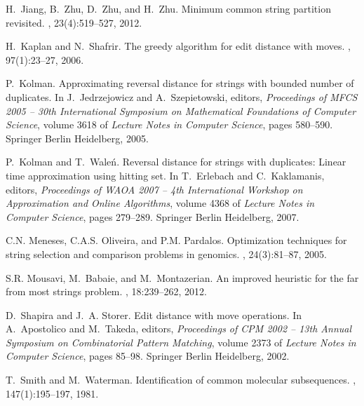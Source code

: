 \documentclass[11pt,a4paper]{article}
\begin{document}
\begin{thebibliography}{10}
H.~Jiang, B.~Zhu, D.~Zhu, and H.~Zhu.
\newblock Minimum common string partition revisited.
, 23(4):519--527, 2012.

H.~Kaplan and N.~Shafrir.
\newblock The greedy algorithm for edit distance with moves.
, 97(1):23--27, 2006.

P.~Kolman.
\newblock Approximating reversal distance for strings with bounded number of
  duplicates.
\newblock In J.~Jedrzejowicz and A.~Szepietowski, editors, {\em Proceedings of
  MFCS 2005 -- 30th International Symposium on Mathematical Foundations of
  Computer Science}, volume 3618 of {\em Lecture Notes in Computer Science},
  pages 580--590. Springer Berlin Heidelberg, 2005.

P.~Kolman and T.~Wale{\'n}.
\newblock Reversal distance for strings with duplicates: Linear time
  approximation using hitting set.
\newblock In T.~Erlebach and C.~Kaklamanis, editors, {\em Proceedings of WAOA
  2007 -- 4th International Workshop on Approximation and Online Algorithms},
  volume 4368 of {\em Lecture Notes in Computer Science}, pages 279--289.
  Springer Berlin Heidelberg, 2007.

C.N. Meneses, C.A.S. Oliveira, and P.M. Pardalos.
\newblock Optimization techniques for string selection and comparison problems
  in genomics.
,
  24(3):81--87, 2005.

S.R. Mousavi, M.~Babaie, and M.~Montazerian.
\newblock An improved heuristic for the far from most strings problem.
, 18:239--262, 2012.

D.~Shapira and J.~A. Storer.
\newblock Edit distance with move operations.
\newblock In A.~Apostolico and M.~Takeda, editors, {\em Proceedings of CPM 2002
  -- 13th Annual Symposium on Combinatorial Pattern Matching}, volume 2373 of
  {\em Lecture Notes in Computer Science}, pages 85--98. Springer Berlin
  Heidelberg, 2002.

T.~Smith and M.~Waterman.
\newblock Identification of common molecular subsequences.
, 147(1):195--197, 1981.

\end{thebibliography}
\end{document}
